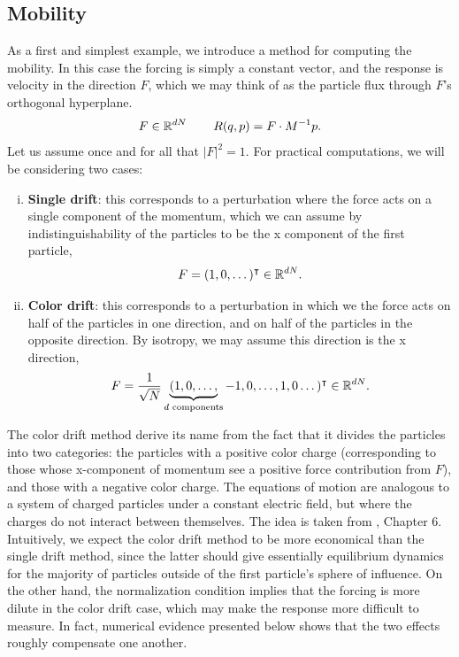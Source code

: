 \subsection{Mobility}
As a first and simplest example, we introduce a method for computing the mobility. In this case the forcing is simply a constant vector, and the response is velocity in the direction $F$, which we may think of as the particle flux through $F$'s orthogonal hyperplane.
\begin{equation}
    \label{eq:nemd_mobility_definitions}
    F\in \mathbb{R}^{dN}\,\qquad R(q,p)=F\cdot M^{-1}p.
\end{equation}
Let us assume once and for all that $|F|^2=1$.
For practical computations, we will be considering two cases:
\begin{enumerate}[(i)]
    \item \textbf{Single drift}: this corresponds to a perturbation where the force acts on a single component of the momentum, which we can assume by indistinguishability of the particles to be the x component of the first particle, \[F=(1,0,\dots)^\intercal \in \mathbb{R}^{dN}.\]
    \item \textbf{Color drift}: this corresponds to a perturbation in which we the force acts on half of the particles in one direction, and on half of the particles in the opposite direction. By isotropy, we may assume this direction is the x direction, \[F=\frac1{\sqrt N}\underbrace{(1,0,\dots,}_{d \text{ components}}-1,0,\dots,1,0\dots)^\intercal \in \mathbb{R}^{dN}.\]
\end{enumerate}
The color drift method derive its name from the fact that it divides the particles into two categories: the particles with a positive color charge (corresponding to those whose x-component of momentum see a positive force contribution from $F$), and those with a negative color charge.
The equations of motion are analogous to a system of charged particles under a constant electric field, but where the charges do not interact between themselves.
The idea is taken from \cite{EM08}, Chapter 6. Intuitively, we expect the color drift method to be more economical than the single drift method, since the latter should give essentially equilibrium dynamics for the majority of particles outside of the first particle's sphere of influence.
On the other hand, the normalization condition implies that the forcing is more dilute in the color drift case, which may make the response more difficult to measure. In fact, numerical evidence presented below shows that the two effects roughly compensate one another.


